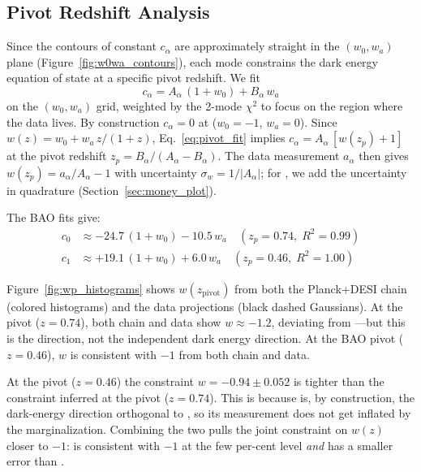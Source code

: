 \subsection{Pivot Redshift Analysis}
\label{sec:pivot_analysis}

Since the contours of constant $c_\alpha$ are approximately straight in the $(w_0, w_a)$ plane (Figure~\ref{fig:w0wa_contours}), each mode constrains the dark energy equation of state at a specific pivot redshift. We fit
\begin{equation}
c_\alpha = A_\alpha\,(1 + w_0) + B_\alpha\, w_a
\label{eq:pivot_fit}
\end{equation}
on the $(w_0, w_a)$ grid, weighted by the 2-mode $\chi^2$ to focus on the region where the data lives. By construction $c_\alpha = 0$ at \LCDM ($w_0 = -1$, $w_a = 0$). Since $w(z) = w_0 + w_a\, z/(1+z)$, Eq.~\ref{eq:pivot_fit} implies $c_\alpha = A_\alpha\, [w(z_p) + 1]$ at the pivot redshift $z_p = B_\alpha / (A_\alpha - B_\alpha)$. The data measurement $a_\alpha$ then gives $w(z_p) = a_\alpha / A_\alpha - 1$ with uncertainty $\sigma_w = 1/|A_\alpha|$; for \czero, we add the \omh uncertainty in quadrature (Section~\ref{sec:money_plot}).

The BAO fits give:
\begin{align}
c_0 &\approx -24.7\,(1 + w_0) - 10.5\, w_a \quad (z_p = 0.74,\; R^2 = 0.99) \label{eq:c0_pivot} \\
c_1 &\approx +19.1\,(1 + w_0) + 6.0\, w_a \quad (z_p = 0.46,\; R^2 = 1.00) \label{eq:c1_pivot}
\end{align}


Figure~\ref{fig:wp_histograms} shows $w(z_\mathrm{pivot})$ from both the Planck+DESI chain (colored histograms) and the data projections (black dashed Gaussians). At the \czero pivot ($z = 0.74$), both chain and data show $w \approx -1.2$, deviating from \LCDM---but this is the \omh direction, not the independent dark energy direction. At the BAO \cone pivot ($z = 0.46$), $w$ is consistent with $-1$ from both chain and data.

At the \cone pivot ($z = 0.46$) the constraint $w = -0.94 \pm 0.052$ is tighter than the constraint inferred at the \czero pivot ($z = 0.74$). This is because \cone is, by construction, the dark-energy direction orthogonal to \omh, so its measurement does not get inflated by the \omh marginalization. Combining the two pulls the joint constraint on $w(z)$ closer to $-1$: \cone is consistent with $-1$ at the few per-cent level \emph{and} has a smaller error than \czero.

